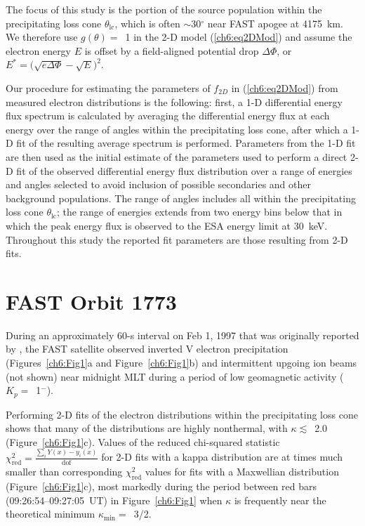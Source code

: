 
  The focus of this study is the portion of the source population within the
  precipitating loss cone $\theta_{\textrm{lc}}$, which is often
  $\sim$30$^\circ$ near FAST apogee at 4175~km. We therefore use $g(\theta) =$~1
  in the 2-D model (\ref{ch6:eq2DMod}) and assume the electron energy $E$ is
  offset by a field-aligned potential drop $\Delta \Phi$, or
  $E^* = \big( \sqrt{e \Delta \Phi} - \sqrt{E} \big)^2$.

  Our procedure for estimating the parameters of $f_{2D}$ in (\ref{ch6:eq2DMod})
  from measured electron distributions is the following: first, a 1-D
  differential energy flux spectrum is calculated by averaging the differential
  energy flux at each energy over the range of angles within the precipitating
  loss cone, after which a 1-D fit of the resulting average spectrum is
  performed. Parameters from the 1-D fit are then used as the initial estimate
  of the parameters used to perform a direct 2-D fit of the observed
  differential energy flux distribution over a range of energies and angles
  selected to avoid inclusion of possible secondaries and other background
  populations. The range of angles includes all within the precipitating loss
  cone $\theta_{\textrm{lc}}$; the range of energies extends from two energy
  bins below that in which the peak energy flux is observed to the ESA energy
  limit at 30~keV. Throughout this study the reported fit parameters are those
  resulting from 2-D fits.

  \section{FAST Orbit 1773}

  During an approximately 60-s interval on Feb 1, 1997 that was originally
  reported by \citet{Elphic1998}, the FAST satellite observed inverted V
  electron precipitation (Figures~\ref{ch6:Fig1}a and Figure~\ref{ch6:Fig1}b)
  and intermittent upgoing ion beams (not shown) near midnight MLT during a
  period of low geomagnetic activity ($K_p =$~1$^-$).

  Performing 2-D fits of the electron distributions within the precipitating
  loss cone shows that many of the distributions are highly nonthermal, with
  $\kappa \lesssim$~2.0 (Figure~\ref{ch6:Fig1}c). Values of the reduced
  chi-squared statistic
  $\chi^2_{\mathrm{red}} = \frac{\sum_i Y(x) - y_i(x)}{\mathrm{dof}}$ for 2-D
  fits with a kappa distribution are at times much smaller than corresponding
  $\chi^2_{\textrm{red}}$ values for fits with a Maxwellian distribution
  (Figure~\ref{ch6:Fig1}c), most markedly during the period between red bars
  (09:26:54--09:27:05~UT) in Figure~\ref{ch6:Fig1} when $\kappa$ is frequently
  near the theoretical minimum $\kappa_{\mathrm{min}} =$~3/2.

